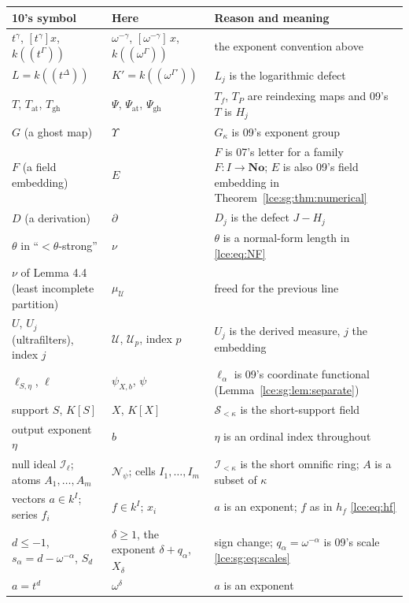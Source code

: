 \documentclass[11pt,letterpaper]{article}
\numberwithin{equation}{section}
\theoremstyle{definition}
\theoremstyle{remark}
\newcommand{\No}{\mathbf{No}}
\newcommand{\Sk}{\mathscr S_{<\kappa}}
\newcommand{\Ik}{\mathscr I_{<\kappa}}
\newcommand{\coef}[2]{[\omega^{#1}]\,#2}
\newcommand{\thref}[1]{Theorem~\ref{#1}}
\newcommand{\leref}[1]{Lemma~\ref{#1}}
\newcommand{\HF}[2]{#1((\omega^{#2}))}
\newcommand{\at}{\mathrm{at}}
\newcommand{\gh}{\mathrm{gh}}
\begin{document}
\begin{center}\small
\begin{longtable}{@{}P{0.26\textwidth}P{0.2\textwidth}P{0.46\textwidth}@{}}
\toprule
\textbf{10's symbol} & \textbf{Here} & \textbf{Reason and meaning}\\
\midrule\endhead
$t^\gamma$, $[t^\gamma]x$, $k((t^\Gamma))$ & $\omega^{-\gamma}$,
$\coef{-\gamma}{x}$, $\HF k\Gamma$ & the exponent convention above\\
$L=k((t^\Delta))$ & $K'=\HF k{\Gamma'}$ & $L_j$ is the logarithmic defect\\
$T$, $T_{\at}$, $T_{\gh}$ & $\Psi$, $\Psi_{\at}$, $\Psi_{\gh}$ & $T_f$, $T_P$
are reindexing maps and 09's $T$ is $H_j$\\
$G$ (a ghost map) & $\Upsilon$ & $G_\kappa$ is 09's exponent group\\
$F$ (a field embedding) & $E$ & $F$ is 07's letter for a family $F:I\to\No$;
$E$ is also 09's field embedding in \thref{lce:sg:thm:numerical}\\
$D$ (a derivation) & $\partial$ & $D_j$ is the defect $J-H_j$\\
$\theta$ in ``$<\theta$-strong'' & $\nu$ & $\theta$ is a normal-form length
in \eqref{lce:eq:NF}\\
$\nu$ of Lemma 4.4 (least incomplete partition) & $\mu_{\mathcal U}$ &
freed for the previous line\\
$U$, $U_j$ (ultrafilters), index $j$ & $\mathcal U$, $\mathcal U_p$, index
$p$ & $U_j$ is the derived measure, $j$ the embedding\\
$\ell_{S,\eta}$, $\ell$ & $\psi_{X,b}$, $\psi$ & $\ell_\alpha$ is 09's
coordinate functional (\leref{lce:sg:lem:separate})\\
support $S$, $K[S]$ & $X$, $K[X]$ & $\Sk$ is the short-support field\\
output exponent $\eta$ & $b$ & $\eta$ is an ordinal index throughout\\
null ideal $\mathcal I_\ell$; atoms $A_1,\dots,A_m$ & $\mathcal N_\psi$;
cells $I_1,\dots,I_m$ & $\Ik$ is the short omnific ring; $A$ is a subset of
$\kappa$\\
vectors $a\in k^I$; series $f_i$ & $f\in k^I$; $x_i$ & $a$ is an exponent;
$f$ as in $h_f$ \eqref{lce:eq:hf}\\
$d\le-1$, $s_\alpha=d-\omega^{-\alpha}$, $S_d$ & $\delta\ge1$, the exponent
$\delta+q_\alpha$, $X_\delta$ & sign change; $q_\alpha=\omega^{-\alpha}$ is
09's scale \eqref{lce:sg:eq:scales}\\
$a=t^d$ & $\omega^\delta$ & $a$ is an exponent\\

\end{longtable}
\end{center}
\end{document}
